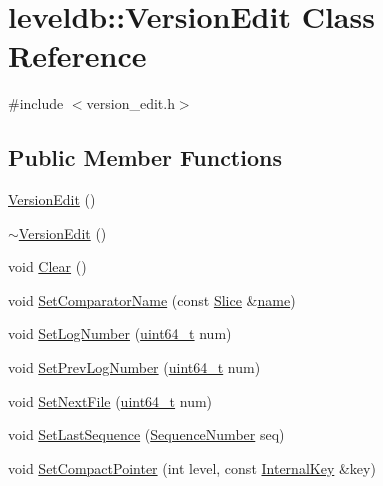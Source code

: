 \hypertarget{classleveldb_1_1_version_edit}{}\section{leveldb\+:\+:Version\+Edit Class Reference}
\label{classleveldb_1_1_version_edit}


{\ttfamily \#include $<$version\+\_\+edit.\+h$>$}

\subsection*{Public Member Functions}
\begin{DoxyCompactItemize}
\item 
\hyperlink{classleveldb_1_1_version_edit_a60dd9c72d256ed1bda68597a9263333e}{Version\+Edit} ()
\item 
\hyperlink{classleveldb_1_1_version_edit_a8863bc7fa645c4bc2518910429447fbe}{$\sim$\+Version\+Edit} ()
\item 
void \hyperlink{classleveldb_1_1_version_edit_a259c9de14d58e231178904c1559e4b5e}{Clear} ()
\item 
void \hyperlink{classleveldb_1_1_version_edit_ab562147cdd82b184e86e88bd375a718c}{Set\+Comparator\+Name} (const \hyperlink{classleveldb_1_1_slice}{Slice} \&\hyperlink{testharness_8cc_a8f8f80d37794cde9472343e4487ba3eb}{name})
\item 
void \hyperlink{classleveldb_1_1_version_edit_a47e5c58d34b0e27dc8990687e0c5477a}{Set\+Log\+Number} (\hyperlink{stdint_8h_aaa5d1cd013383c889537491c3cfd9aad}{uint64\+\_\+t} num)
\item 
void \hyperlink{classleveldb_1_1_version_edit_ac1b5689f62e7a8f63c4eefa437a4f2f3}{Set\+Prev\+Log\+Number} (\hyperlink{stdint_8h_aaa5d1cd013383c889537491c3cfd9aad}{uint64\+\_\+t} num)
\item 
void \hyperlink{classleveldb_1_1_version_edit_a4c104515adf573be0ead29e6835f14fb}{Set\+Next\+File} (\hyperlink{stdint_8h_aaa5d1cd013383c889537491c3cfd9aad}{uint64\+\_\+t} num)
\item 
void \hyperlink{classleveldb_1_1_version_edit_abd6e841ed400672d33d26f4b187a66bf}{Set\+Last\+Sequence} (\hyperlink{namespaceleveldb_a5481ededd221c36d652c371249f869fa}{Sequence\+Number} seq)
\item 
void \hyperlink{classleveldb_1_1_version_edit_ac9b26dfba1188705d7fc4deaf047271c}{Set\+Compact\+Pointer} (int level, const \hyperlink{classleveldb_1_1_internal_key}{Internal\+Key} \&key)
\item 

\end{DoxyCompactItemize}
